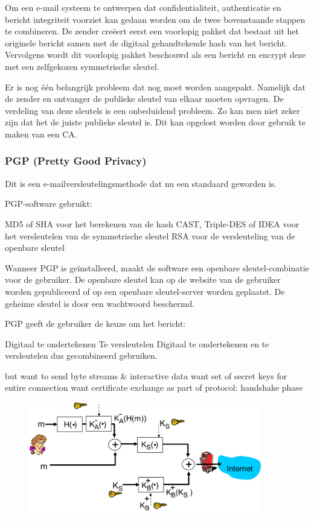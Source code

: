 \noindent Om een e-mail systeem te ontwerpen dat confidentialiteit, authenticatie en bericht integriteit voorziet kan gedaan worden om de twee bovenstaande stappen te combineren. De zender creëert eerst een voorlopig pakket dat bestaat uit het originele bericht samen met de digitaal gehandtekende hash van het bericht. Vervolgens wordt dit voorlopig pakket beschouwd als een bericht en encrypt deze met een zelfgekozen symmetrische sleutel.

\noindent Er is nog één belangrijk probleem dat nog moet worden aangepakt. Namelijk dat de zender en ontvanger de publieke sleutel van elkaar moeten opvragen. De verdeling van deze sleutels is een onbeduidend probleem. Zo kan men niet zeker zijn dat het de juiste publieke sleutel is. Dit kan opgelost worden door gebruik te maken van een CA.

\subsubsection{PGP (Pretty Good Privacy)}

\fra Dit is een e-mailversleutelingsmethode dat nu een standaard geworden is.

\noindent PGP-software gebruikt:

\bi
\itf MD5 of SHA voor het berekenen van de hash
\itf CAST, Triple-DES of IDEA voor het versleutelen van de symmetrische sleutel
\itf RSA voor de versleuteling van de openbare sleutel
\ei
	
\noindent Wanneer PGP is geïnstalleerd, maakt de software een openbare sleutel-combinatie voor de gebruiker. De openbare sleutel kan op de website van de gebruiker worden gepubliceerd of op een openbare sleutel-server worden geplaatst. De geheime sleutel is door een wachtwoord beschermd.

PGP geeft de gebruiker de keuze om het bericht:

\bi
\itf Digitaal te ondertekenen
\itf Te versleutelen
\itf Digitaal te ondertekenen en te versleutelen dus gecombineerd gebruiken.
\ei

\bi
\itf but want to send byte streams \& interactive data
\itf want set of secret keys for entire connection
\itf want certificate exchange as part of protocol: handshake phase
\ei

\begin{figure}[h]
    \centering
\includegraphics[width=4in]{./img/imghfdst8/hfdst8puntje26.png}
    \caption{ }      
    \label{fig: }
\end{figure}

